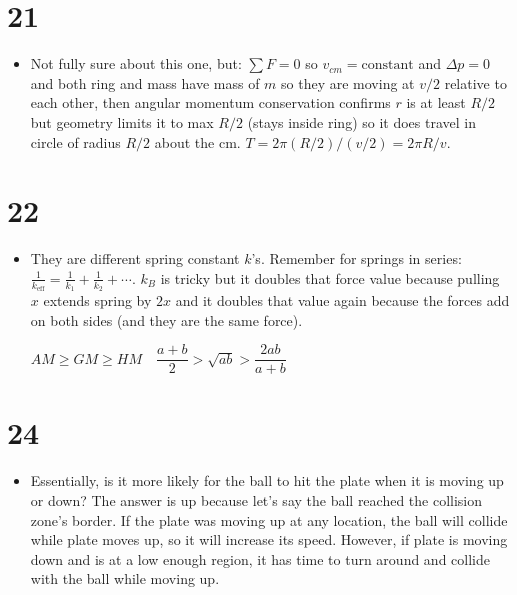 \documentclass[11pt]{article}
\begin{document}
\section*{21}
\begin{itemize}[leftmargin=*, itemsep=0.25em]
\item Not fully sure about this one, but: $\sum F=0$ so $v_{cm}=\text{constant}$ and $\Delta p=0$ and both ring and mass have mass of $m$ so they are moving at $v/2$ relative to each other, then angular momentum conservation confirms $r$ is at least $R/2$ but geometry limits it to max $R/2$ (stays inside ring) so it does travel in circle of radius $R/2$ about the cm. $T=2\pi(R/2)/(v/2)=2\pi R/v$.
\end{itemize}

\section*{22}
\begin{itemize}[leftmargin=*, itemsep=0.25em]
\item They are different spring constant $k$'s. Remember for springs in series: $\frac{1}{k_{\text{eff}}}=\frac{1}{k_1}+\frac{1}{k_2}+\cdots$. $k_B$ is tricky but it doubles that force value because pulling $x$ extends spring by $2x$ and it doubles that value again because the forces add on both sides (and they are the same force).

\vspace{0.5em}
\begin{center}
$AM\ge GM\ge HM\quad \dfrac{a+b}{2}>\sqrt{ab}>\dfrac{2ab}{a+b}$
\end{center}
\end{itemize}

\section*{24}
\begin{itemize}[leftmargin=*, itemsep=0.25em]
\item Essentially, is it more likely for the ball to hit the plate when it is moving up or down? The answer is up because let's say the ball reached the collision zone's border. If the plate was moving up at any location, the ball will collide while plate moves up, so it will increase its speed. However, if plate is moving down and is at a low enough region, it has time to turn around and collide with the ball while moving up.
\end{itemize}
\end{document}

